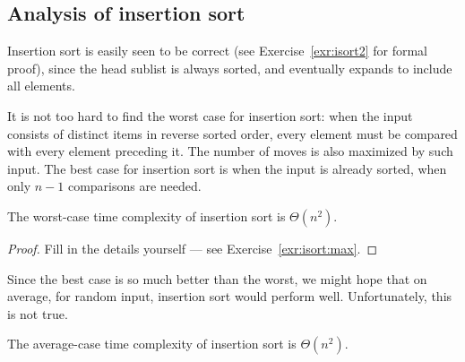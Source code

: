 \subsection*{Analysis of insertion sort}

Insertion sort is easily seen to be correct (see Exercise~\ref{exr:isort2} for 
formal proof), since the head sublist is always sorted, and eventually expands to
include all elements.

It is not too hard to find the worst case for insertion sort: when the input 
consists of distinct items in reverse sorted order, every element must be 
compared with every element preceding it. The number of moves is also 
maximized by such input. The best case for insertion sort is when the input is 
already sorted, when only $n-1$ comparisons are needed.


\begin{Lemma} \label{lem:worst insort}
The worst-case time complexity of insertion sort is $\Theta(n^2)$.
\end{Lemma}
\begin{proof}
Fill in the details yourself --- see Exercise~\ref{exr:isort:max}.
\end{proof}

Since the best case is so much better than the worst, we might hope that on 
average, for random input, insertion sort would perform well. Unfortunately, 
this is not true.

\begin{Lemma}\label{lem:ave:insort}
The average-case time complexity of insertion sort is \(\Theta(n^2 )\).
\end{Lemma}

